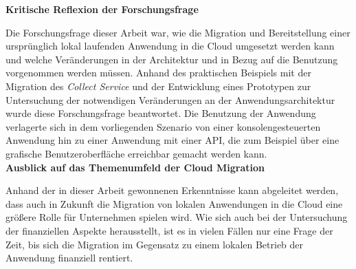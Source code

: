 \textbf{Kritische Reflexion der Forschungsfrage}

Die Forschungsfrage dieser Arbeit war, wie die Migration und Bereitstellung einer ursprünglich lokal laufenden Anwendung in die Cloud umgesetzt werden kann und welche Veränderungen in der Architektur und in Bezug auf die Benutzung vorgenommen werden müssen. Anhand des praktischen Beispiels mit der Migration des \textit{Collect Service} und der Entwicklung eines Prototypen zur Untersuchung der notwendigen Veränderungen an der Anwendungsarchitektur wurde diese Forschungsfrage beantwortet. Die Benutzung der Anwendung verlagerte sich in dem vorliegenden Szenario von einer konsolengesteuerten Anwendung hin zu einer Anwendung mit einer \ac{API}, die zum Beispiel über eine grafische Benutzeroberfläche erreichbar gemacht werden kann. \\

\textbf{Ausblick auf das Themenumfeld der Cloud Migration}

Anhand der in dieser Arbeit gewonnenen Erkenntnisse kann abgeleitet werden, dass auch in Zukunft die Migration von lokalen Anwendungen in die Cloud eine größere Rolle für Unternehmen spielen wird. Wie sich auch bei der Untersuchung der finanziellen Aspekte herausstellt, ist es in vielen Fällen nur eine Frage der Zeit, bis sich die Migration im Gegensatz zu einem lokalen Betrieb der Anwendung finanziell rentiert.
